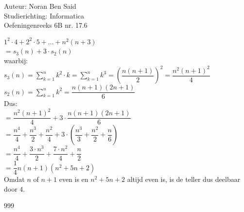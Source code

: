 \documentclass[a4paper]{article}
\begin{document}
  
\noindent \large Auteur: Noran Ben Said \\
\noindent \large Studierichting: Informatica\\
\noindent \large Oefeningenreeks 6B nr. 17.6\\

\medskip

\normalsize

$1^2 \cdot 4 + 2^2 \cdot 5 + \dots + n^2(n + 3)$ \\

$= s_3(n) + 3 \cdot s_2(n)$ \\

waarbij: \\

$s_3(n) = \displaystyle\sum\limits_{k=1}^{n} k^2 \cdot k = \displaystyle\sum\limits_{k=1}^{n} k^3 = \left( \dfrac{n(n+1)}{2} \right)^2 = \dfrac{n^2(n+1)^2}{4}$ \\

$s_2(n) = \displaystyle\sum\limits_{k=1}^{n} k^2 = \dfrac{n(n+1)(2n+1)}{6}$ \\

Dus: \\

$= \dfrac{n^2(n+1)^2}{4} + 3 \cdot \dfrac{n(n+1)(2n+1)}{6}$ \\

$= \dfrac{n^4}{4} + \dfrac{n^3}{2} + \dfrac{n^2}{4} + 3 \cdot \left( \dfrac{n^3}{3} + \dfrac{n^2}{2} + \dfrac{n}{6} \right)$ \\

$= \dfrac{n^4}{4} + \dfrac{3 \cdot n^3}{2} + \dfrac{7 \cdot n^2}{4} + \dfrac{n}{2}$ \\

$= \dfrac{1}{4}n(n+1)(n^2 + 5n + 2)$ \\

Omdat $n$ of $n+1$ even is en $n^2 + 5n + 2$ altijd even is, is de teller dus deelbaar door $4$. \\


\begin{thebibliography}{999}
\end{thebibliography}
\end{document}
